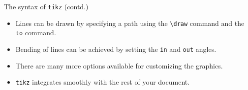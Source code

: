 \documentclass{beamer}
\begin{document}
\begin{frame}{The syntax of \texttt{tikz} (contd.)}
  \begin{itemize}
    \item Lines can be drawn by specifying a path using the \texttt{\textbackslash draw} command and the \texttt{to} command.
    \item Bending of lines can be achieved by setting the \texttt{in} and \texttt{out} angles.
    \item There are many more options available for customizing the graphics.
    \item \texttt{tikz} integrates smoothly with the rest of your document.
  \end{itemize}
\end{frame}
\end{document}
